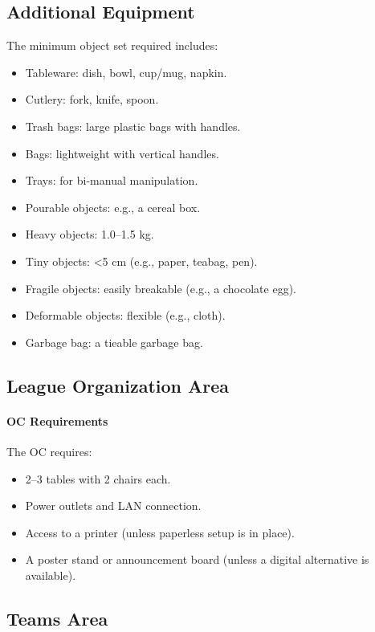 \subsection{Additional Equipment}
The minimum object set required includes:
\begin{itemize}
    \item Tableware: dish, bowl, cup/mug, napkin.
    \item Cutlery: fork, knife, spoon.
    \item Trash bags: large plastic bags with handles.
    \item Bags: lightweight with vertical handles.
    \item Trays: for bi-manual manipulation.
    \item Pourable objects: e.g., a cereal box.
    \item Heavy objects: 1.0--1.5 kg.
    \item Tiny objects: \textless{}5 cm (e.g., paper, teabag, pen).
    \item Fragile objects: easily breakable (e.g., a chocolate egg).
    \item Deformable objects: flexible (e.g., cloth).
    \item Garbage bag: a tieable garbage bag.
\end{itemize}

\subsection{League Organization Area}
\paragraph{OC Requirements} The OC requires:
\begin{itemize}
    \item 2--3 tables with 2 chairs each.
    \item Power outlets and LAN connection.
    \item Access to a printer (unless paperless setup is in place).
    \item A poster stand or announcement board (unless a digital alternative is available).
\end{itemize}

\subsection{Teams Area}
